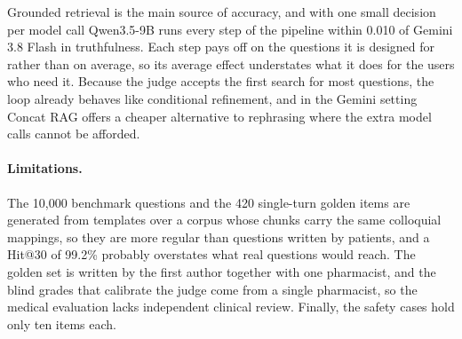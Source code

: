 Grounded retrieval is the main source of accuracy, and with one small decision per model call Qwen3.5-9B runs every step of the pipeline within 0.010 of Gemini 3.8 Flash in truthfulness. Each step pays off on the questions it is designed for rather than on average, so its average effect understates what it does for the users who need it. Because the judge accepts the first search for most questions, the loop already behaves like conditional refinement, and in the Gemini setting Concat RAG offers a cheaper alternative to rephrasing where the extra model calls cannot be afforded.

\paragraph{Limitations.} The 10{,}000 benchmark questions and the 420 single-turn golden items are generated from templates over a corpus whose chunks carry the same colloquial mappings, so they are more regular than questions written by patients, and a Hit@30 of 99.2\% probably overstates what real questions would reach. The golden set is written by the first author together with one pharmacist, and the blind grades that calibrate the judge come from a single pharmacist, so the medical evaluation lacks independent clinical review. Finally, the safety cases hold only ten items each.
